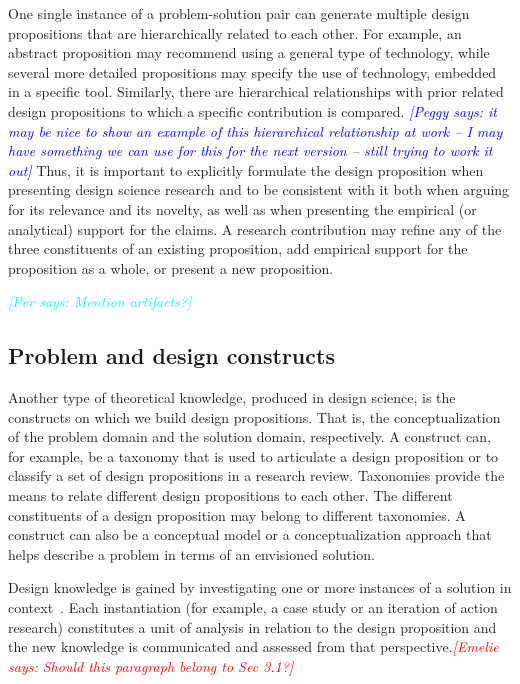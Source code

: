 \documentclass[graybox]{svmult}
\newcommand{\emelie}[1]{\textcolor{red}{{\it [Emelie says: #1]}}}
\newcommand{\peggy}[1]{\textcolor{blue}{{\it [Peggy says: #1]}}}
\newcommand{\per}[1]{\textcolor{cyan}{{\it [Per says: #1]}}}
\newcommand{\emelie}[1]{}
\newcommand{\peggy}[1]{}
\newcommand{\per}[1]{}
\begin{document}
One single instance of a problem-solution pair can generate multiple design propositions that are hierarchically related to each other. For example, an abstract proposition may recommend using a general type of technology, while several more detailed propositions may specify the use of technology, embedded in a specific tool.  Similarly, there are hierarchical relationships with prior related design propositions to which a specific contribution is compared.
\peggy{it may be nice to show an example of this hierarchical relationship at work -- I may have something we can use for this for the next version -- still trying to work it out}
Thus, it is important to explicitly formulate the design proposition when presenting design science research and to be consistent with it both when arguing for its relevance and its novelty, as well as when presenting the empirical (or analytical) support for the claims.  A research contribution may refine any of the three constituents of an existing proposition, add empirical support for the proposition as a whole, or present a new proposition.

\per{Mention artifacts?}



\subsection{Problem and design constructs}
\label{sec:constructs}
Another type of theoretical knowledge, produced in design science, is the 
constructs on which we build design propositions. That is, the conceptualization of the problem domain and the solution domain, respectively.  
A construct can, for example, be a taxonomy that is used to articulate a design proposition or to classify a set of design propositions in a research review. 
Taxonomies provide the means to relate different design propositions to each other. The different constituents of a design proposition may belong to different taxonomies. A construct can also be a conceptual model or a conceptualization approach that helps describe a problem in terms of an envisioned solution.

Design knowledge is gained by investigating one or more instances of a solution in context~\cite{wieringa_what_2014}. Each instantiation (for example, a case study or an iteration of action research) constitutes a unit of analysis in relation to the design proposition and the new knowledge is communicated and assessed from that perspective.\emelie{Should this paragraph belong to Sec 3.1?} 
\end{document}
